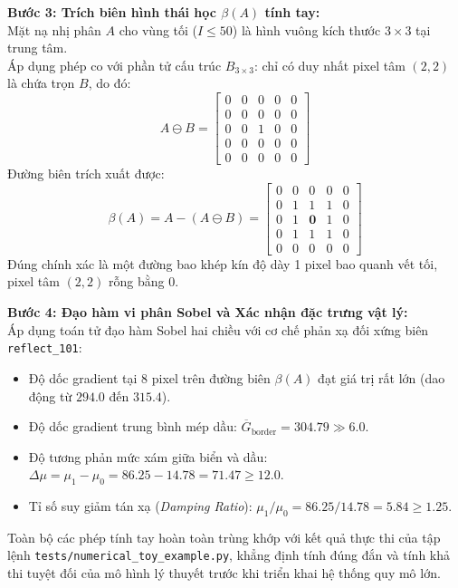 \textbf{Bước 3: Trích biên hình thái học $\beta(A)$ tính tay:}\\
Mặt nạ nhị phân $A$ cho vùng tối ($I \le 50$) là hình vuông kích thước $3 \times 3$ tại trung tâm.\\
Áp dụng phép co với phần tử cấu trúc $B_{3 \times 3}$: chỉ có duy nhất pixel tâm $(2, 2)$ là chứa trọn $B$, do đó:
\begin{equation}
    A \ominus B = \begin{bmatrix}
    0 & 0 & 0 & 0 & 0 \\
    0 & 0 & 0 & 0 & 0 \\
    0 & 0 & 1 & 0 & 0 \\
    0 & 0 & 0 & 0 & 0 \\
    0 & 0 & 0 & 0 & 0
    \end{bmatrix}
\end{equation}
Đường biên trích xuất được:
\begin{equation}
    \beta(A) = A - (A \ominus B) = \begin{bmatrix}
    0 & 0 & 0 & 0 & 0 \\
    0 & 1 & 1 & 1 & 0 \\
    0 & 1 & \mathbf{0} & 1 & 0 \\
    0 & 1 & 1 & 1 & 0 \\
    0 & 0 & 0 & 0 & 0
    \end{bmatrix}
\end{equation}
Đúng chính xác là một đường bao khép kín độ dày 1 pixel bao quanh vết tối, pixel tâm $(2, 2)$ rỗng bằng 0.

\textbf{Bước 4: Đạo hàm vi phân Sobel và Xác nhận đặc trưng vật lý:}\\
Áp dụng toán tử đạo hàm Sobel hai chiều với cơ chế phản xạ đối xứng biên \texttt{reflect\_101}:
\begin{itemize}
    \item Độ dốc gradient tại 8 pixel trên đường biên $\beta(A)$ đạt giá trị rất lớn (dao động từ $294.0$ đến $315.4$).
    \item Độ dốc gradient trung bình mép dầu: $\overline{G}_{\text{border}} = 304.79 \gg 6.0$.
    \item Độ tương phản mức xám giữa biển và dầu: $\Delta \mu = \mu_1 - \mu_0 = 86.25 - 14.78 = 71.47 \ge 12.0$.
    \item Tỉ số suy giảm tán xạ (\textit{Damping Ratio}): $\mu_1 / \mu_0 = 86.25 / 14.78 = 5.84 \ge 1.25$.
\end{itemize}
Toàn bộ các phép tính tay hoàn toàn trùng khớp với kết quả thực thi của tập lệnh \texttt{tests/numerical\_toy\_example.py}, khẳng định tính đúng đắn và tính khả thi tuyệt đối của mô hình lý thuyết trước khi triển khai hệ thống quy mô lớn.
